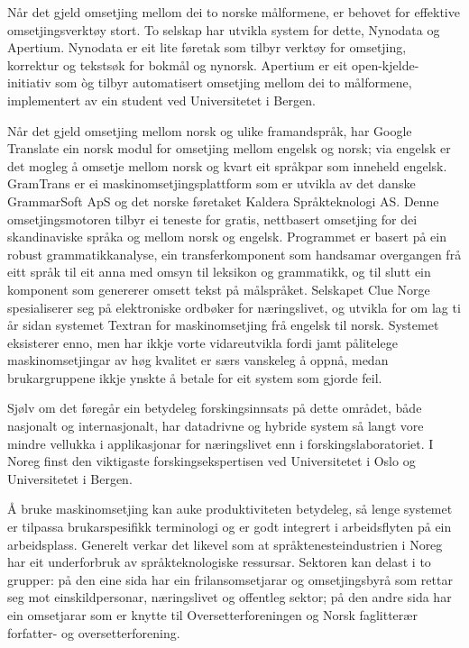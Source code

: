 \begin{multicols}{2}

Når det gjeld omsetjing mellom dei to norske målformene, er behovet for effektive omsetjingsverktøy stort. To selskap har utvikla system for dette, Nynodata og Apertium. Nynodata er eit lite føretak som tilbyr verktøy for omsetjing, korrektur og tekstsøk for bokmål og nynorsk. Apertium er eit open-kjelde-initiativ som òg tilbyr automatisert omsetjing mellom dei to målformene, implementert av ein student ved Universitetet i Bergen.

Når det gjeld omsetjing mellom norsk og ulike framandspråk, har Google Translate ein norsk modul for omsetjing mellom engelsk og norsk; via engelsk er det mogleg å omsetje mellom norsk og kvart eit språkpar som inneheld engelsk. GramTrans er ei maskinomsetjingsplattform som er utvikla av det danske GrammarSoft ApS og det norske føretaket Kaldera Språkteknologi AS. Denne omsetjingsmotoren tilbyr ei teneste for gratis, nettbasert omsetjing for dei skandinaviske språka og mellom norsk og engelsk. Programmet er basert på ein robust grammatikkanalyse, ein transferkomponent som handsamar overgangen frå eitt språk til eit anna med omsyn til leksikon og grammatikk, og til slutt ein komponent som genererer omsett tekst på målspråket. Selskapet Clue Norge spesialiserer seg på elektroniske ordbøker for næringslivet, og utvikla for om lag ti år sidan systemet Textran for maskinomsetjing frå engelsk til norsk. Systemet eksisterer enno, men har ikkje vorte vidareutvikla fordi jamt pålitelege maskinomsetjingar av høg kvalitet er særs vanskeleg å oppnå, medan brukargruppene ikkje ynskte å betale for eit system som gjorde feil.

Sjølv om det føregår ein betydeleg forskingsinnsats på dette området, både nasjonalt og internasjonalt, har datadrivne og hybride system så langt vore mindre vellukka i applikasjonar for næringslivet enn i forskingslaboratoriet. I Noreg finst den viktigaste forskingsekspertisen ved Universitetet i Oslo og Universitetet i Bergen.


Å bruke maskinomsetjing kan auke produktiviteten betydeleg, så lenge systemet er tilpassa brukarspesifikk terminologi og er godt integrert i arbeidsflyten på ein arbeidsplass. Generelt verkar det likevel som at språktenesteindustrien i Noreg har eit underforbruk av språkteknologiske ressursar. 
Sektoren kan delast i to grupper: på den eine sida har ein frilansomsetjarar og omsetjingsbyrå som rettar seg mot einskildpersonar, næringslivet og offentleg sektor; på den andre sida har ein omsetjarar som er knytte til Oversetterforeningen og Norsk faglitterær forfatter- og oversetterforening.


\end{multicols}
